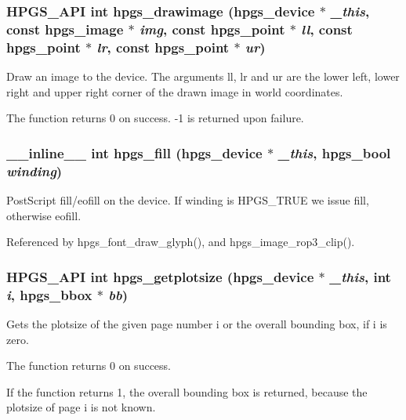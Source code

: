 \subsubsection[{hpgs\_\-drawimage}]{\setlength{\rightskip}{0pt plus 5cm}HPGS\_\-API int hpgs\_\-drawimage ({\bf hpgs\_\-device} $\ast$ {\em \_\-this}, \/  const {\bf hpgs\_\-image} $\ast$ {\em img}, \/  const {\bf hpgs\_\-point} $\ast$ {\em ll}, \/  const {\bf hpgs\_\-point} $\ast$ {\em lr}, \/  const {\bf hpgs\_\-point} $\ast$ {\em ur})}\label{group__device_ga6c31703bf9edc382b8b89da02e8f0fed}
Draw an image to the device. The arguments {\ttfamily ll}, {\ttfamily lr} and {\ttfamily ur} are the lower left, lower right and upper right corner of the drawn image in world coordinates.

The function returns 0 on success. -\/1 is returned upon failure. 
\subsubsection[{hpgs\_\-fill}]{\setlength{\rightskip}{0pt plus 5cm}\_\-\_\-inline\_\-\_\- int hpgs\_\-fill ({\bf hpgs\_\-device} $\ast$ {\em \_\-this}, \/  hpgs\_\-bool {\em winding})\hspace{0.3cm}{\ttfamily  [static]}}\label{group__device_ga089db13124aa75a45a6e913aca62e4d4}
PostScript fill/eofill on the device. If {\ttfamily winding} is {\ttfamily HPGS\_\-TRUE} we issue {\ttfamily fill}, otherwise {\ttfamily eofill}. 

Referenced by hpgs\_\-font\_\-draw\_\-glyph(), and hpgs\_\-image\_\-rop3\_\-clip().

\subsubsection[{hpgs\_\-getplotsize}]{\setlength{\rightskip}{0pt plus 5cm}HPGS\_\-API int hpgs\_\-getplotsize ({\bf hpgs\_\-device} $\ast$ {\em \_\-this}, \/  int {\em i}, \/  {\bf hpgs\_\-bbox} $\ast$ {\em bb})}\label{group__device_ga409181ae96a9c9fe88bc4327552ac242}
Gets the plotsize of the given page number {\ttfamily i} or the overall bounding box, if {\ttfamily i} is zero.

The function returns 0 on success.

If the function returns 1, the overall bounding box is returned, because the plotsize of page {\ttfamily i} is not known.

